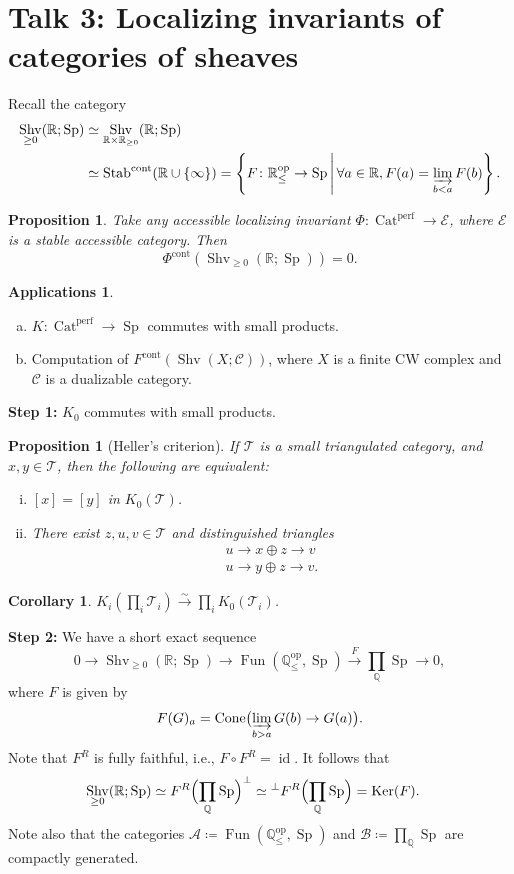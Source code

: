 \documentclass[draft]{amsart}
\newcommand{\QQ}{\mathbb{Q}}
\newcommand{\RR}{\mathbb{R}}
\newcommand{\set}[2]{\left\{#1\,\middle|\,#2\right\}}
\newcommand{\cat}[1]{\mathcal{#1}}
\newcommand{\op}{\mathrm{op}}
\newcommand{\xto}[1]{\mathbin{\xrightarrow{#1}}}
\newcommand{\isoto}{\mathbin{\xrightarrow{\sim}}}
\newcommand{\Stab}{\mathrm{Stab}}
\DeclareMathOperator{\Shv}{Shv}
\DeclareMathOperator{\Cat}{Cat}
\DeclareMathOperator{\Sp}{Sp}
\DeclareMathOperator{\Fun}{Fun}
\DeclareMathOperator{\id}{id}
\DeclareMathOperator{\Ker}{Ker}
\DeclareMathOperator{\Cone}{Cone}
\newtheorem{prop}[thm]{Proposition}
\newtheorem{cor}[thm]{Corollary}
\theoremstyle{definition}
\newtheorem{applications}[thm]{Applications}
\begin{document}
\section{Talk 3: Localizing invariants of categories of sheaves}
Recall the category 
\begin{align*}
\Shv_{\ge0}(\RR;\Sp) &\simeq \Shv_{\RR\times \RR_{\ge0}}(\RR; \Sp) \\
&\simeq \Stab^{\mathrm{cont}}(\RR\cup \{\infty\}) 
= \set{F\colon \RR_{\le}^{\op} \to \Sp}{\forall a\in \RR, F(a) = \varinjlim_{b<a} F(b)}.
\end{align*}

\begin{prop}
Take any accessible localizing invariant $\Phi\colon \Cat^{\mathrm{perf}} \to \cat E$, where $\cat E$ is a stable accessible category. Then
\[
\Phi^{\mathrm{cont}}(\Shv_{\ge0}(\RR;\Sp)) = 0.
\]
\end{prop}

\begin{applications}
\begin{enumerate}[(a)]
\item $K\colon \Cat^{\mathrm{perf}} \to \Sp$ commutes with small products.
\item Computation of $F^{\mathrm{cont}}(\Shv(X;\cat C))$, where $X$ is a finite CW complex and $\cat C$ is a dualizable category.
\end{enumerate}
\end{applications}

\textbf{Step 1:} $K_0$ commutes with small products.
\begin{prop}[Heller's criterion]
If $\cat T$ is a small triangulated category, and $x,y\in \cat T$, then the following are equivalent:
\begin{enumerate}[(i)]
\item $[x] = [y]$ in $K_0(\cat T)$.
\item There exist $z,u,v\in \cat T$ and distinguished triangles 
\begin{align*}
u \to x\oplus z \to v \\
u \to y\oplus z \to v.
\end{align*}
\end{enumerate}
\end{prop}

\begin{cor}
$K_i(\prod_i \cat T_i)\isoto \prod_i K_0(\cat T_i)$.
\end{cor}

\textbf{Step 2:} We have a short exact sequence
\[
0\to \Shv_{\ge0}(\RR; \Sp) \to \Fun(\QQ_{\le}^{\op}, \Sp)\xto{F} \prod_{\QQ} \Sp \to 0,
\]
where $F$ is given by
\[
F(G)_a = \Cone\bigl(\varinjlim_{b>a} G(b) \to G(a)\bigr).
\]
Note that $F^R$ is fully faithful, i.e., $F\circ F^R = \id$. It follows that
\begin{align*}
\Shv_{\ge0}(\RR; \Sp) &\simeq F^R\Bigl(\prod_{\QQ}\Sp\Bigr)^{\perp} \simeq {}^{\perp} F^R\Bigl(\prod_{\QQ}\Sp\Bigr) = \Ker(F).
\end{align*}
Note also that the categories $\cat A\coloneqq \Fun(\QQ_{\le}^\op, \Sp)$ and $\cat B \coloneqq \prod_{\QQ}\Sp$ are compactly generated.
\end{document}
